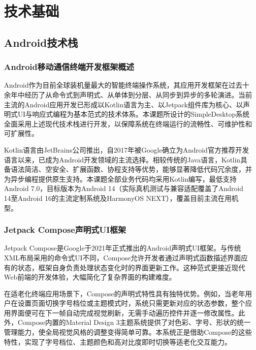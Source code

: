 




\chapter{技术基础}

\section{Android技术栈}

\subsection{Android移动通信终端开发框架概述}

Android作为目前全球装机量最大的智能终端操作系统，其应用开发框架在过去十余年中经历了从命令式到声明式、从单体到分层、从同步到异步的多轮演进。当前主流的Android应用开发已形成以Kotlin语言为主、以Jetpack组件库为核心、以声明式UI与响应式编程为基本范式的技术体系。本课题所设计的SimpleDesktop系统全面采用上述现代技术栈进行开发，以保障系统在终端运行的流畅性、可维护性和可扩展性。

Kotlin语言由JetBrains公司推出，自2017年被Google确立为Android官方推荐开发语言以来，已成为Android开发领域的主流选择。相较传统的Java语言，Kotlin具备语法简洁、空安全、扩展函数、协程支持等优势，能够显著降低代码冗余度，并为异步编程提供原生支持。本课题全部业务代码均采用Kotlin编写，最低支持Android 7.0，目标版本为Android 14（实际真机测试与兼容适配覆盖了Android 14至Android 16的主流定制系统及HarmonyOS NEXT），覆盖目前主流在用机型。

\subsection{Jetpack Compose声明式UI框架}

Jetpack Compose是Google于2021年正式推出的Android声明式UI框架。与传统XML布局采用的命令式UI不同，Compose允许开发者通过声明式函数描述界面应有的状态，框架自身负责处理状态变化时的界面更新工作。这种范式更接近现代Web前端的开发体验，大幅简化了复杂界面的构建难度。

在适老化终端应用场景下，Compose的声明式特性具有独特优势。例如，当老年用户在设置页面切换字号档位或主题模式时，系统只需更新对应的状态参数，整个应用界面便可在下一帧自动完成视觉刷新，无需手动遍历控件并逐一修改属性。此外，Compose内置的Material Design 3主题系统提供了对色彩、字号、形状的统一管理能力，使全局视觉风格的调整变得简单可靠。本系统正是借助Compose的这些特性，实现了字号档位、主题颜色和高对比度即时切换等适老化交互能力。

